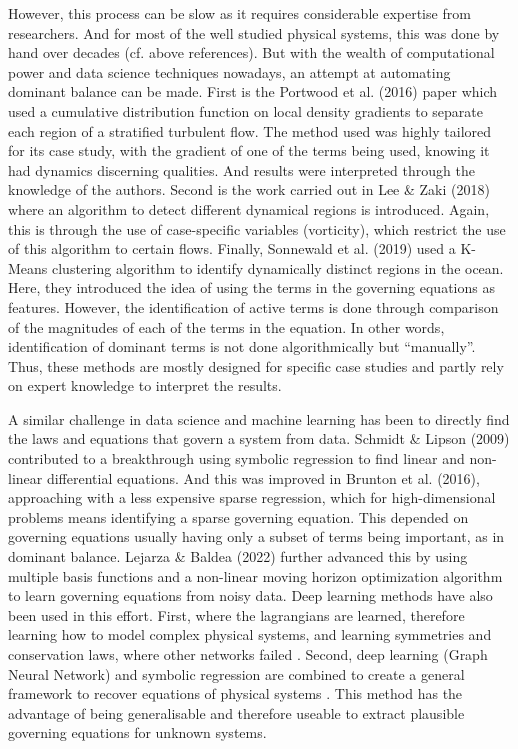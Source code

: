 \documentclass[12pt]{report} %
\begin{document}
However, this process can be slow as it requires considerable expertise from researchers. And for most of the well studied physical systems, this was done by hand over decades (cf. above references). But with the wealth of computational power and data science techniques nowadays, an attempt at automating dominant balance can be made. First is the Portwood et al. (2016)\cite{portwood2016robust} paper which used a cumulative distribution function on local density gradients to separate each region of a stratified turbulent flow. The method used was highly tailored for its case study, with the gradient of one of the terms being used, knowing it had dynamics discerning qualities. And results were interpreted through the knowledge of the authors. Second is the work carried out in Lee \& Zaki (2018)\cite{lee2018detection} where an algorithm to detect different dynamical regions is introduced. Again, this is through the use of case-specific variables (vorticity), which restrict the use of this algorithm to certain flows. Finally, Sonnewald et al. (2019)\cite{sonnewald2019unsupervised} used a K-Means clustering algorithm to identify dynamically distinct regions in the ocean. Here, they introduced the idea of using the terms in the governing equations as features. However, the identification of active terms is done through comparison of the magnitudes of each of the terms in the equation. In other words, identification of dominant terms is not done algorithmically but ``manually''. Thus, these methods are mostly designed for specific case studies and partly rely on expert knowledge to interpret the results.

\vspace{5mm}

A similar challenge in data science and machine learning has been to directly find the laws and equations that govern a system from data. Schmidt \& Lipson (2009)\cite{schmidt2009distilling} contributed to a breakthrough using symbolic regression to find linear and non-linear differential equations. And this was improved in Brunton et al. (2016)\cite{brunton2016discovering}, approaching with a less expensive sparse regression, which for high-dimensional problems means identifying a sparse governing equation. This depended on governing equations usually having only a subset of terms being important, as in dominant balance. Lejarza \& Baldea (2022)\cite{lejarza2022data} further advanced this by using multiple basis functions and a non-linear moving horizon optimization algorithm to learn governing equations from noisy data. Deep learning methods have also been used in this effort. First, where the lagrangians are learned, therefore learning how to model complex physical systems, and learning symmetries and conservation laws, where other networks failed \cite{cranmer2020lagrangian}. Second, deep learning (Graph Neural Network) and symbolic regression are combined to create a general framework to recover equations of physical systems \cite{cranmer2020discovering}. This method has the advantage of being generalisable and therefore useable to extract plausible governing equations for unknown systems.
\end{document}
